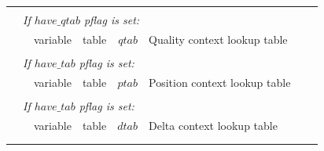\documentclass[a4paper]{article}
\begin{document}
\begin{table}
\begin{tabular}{|r|r|r|r|r|p{8cm}|l|l|}
& \multicolumn{6}{l|}{} & \\[-0.5em]
\multicolumn{1}{|l|}{} & \multicolumn{6}{l|}{ \textit{If $have\_qtab$ pflag is set:} } & \\
\cline{3-6}
                       &  & variable                   & table          & $qtab$                         & Quality context lookup table & & \\
\cline{3-6}

& \multicolumn{6}{l|}{} & \\[-0.5em]
\multicolumn{1}{|l|}{} & \multicolumn{6}{l|}{ \textit{If $have\_tab$ pflag is set:} } & \\
\cline{3-6}
                       &  & variable                   & table          & $ptab$                         & Position context lookup table & & \\
\cline{3-6}

& \multicolumn{6}{l|}{} & \\[-0.5em]
\multicolumn{1}{|l|}{} & \multicolumn{6}{l|}{ \textit{If $have\_tab$ pflag is set:} } & \\
\cline{3-6}
                       &  & variable                   & table          & $dtab$                         & Delta context lookup table & & \\
\cline{3-6}
& \multicolumn{6}{l|}{} & \\
\cline{2-7}
\multicolumn{8}{|l|}{}\\
\hline
\end{tabular}
\end{table}

%
%
%
%
\end{document}
